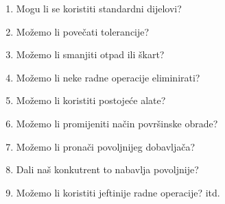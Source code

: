 \documentclass[a4paper,12pt]{article}
\numberwithin{figure}{section}
\begin{document}
\begin{enumerate}
\begin{center}
\begin{enumerate}
\item Mogu li se koristiti standardni dijelovi?
\item Možemo li povečati tolerancije?
\item Možemo li smanjiti otpad ili škart?
\item Možemo li neke radne operacije eliminirati?
\item Možemo li koristiti postojeće alate?
\item Možemo li promijeniti način površinske obrade?
\item Možemo li pronači povoljnijeg dobavljača?
\item Dali naš konkutrent to nabavlja povoljnije?
\item Možemo li koristiti jeftinije radne operacije? itd.
\end{enumerate}
\end{center} 
\end{enumerate}
\end{document}
